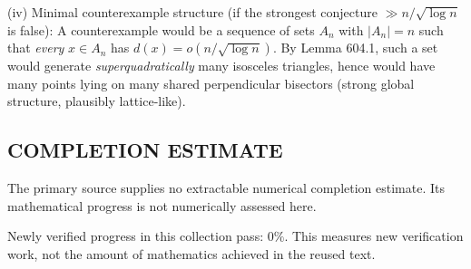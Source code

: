 (iv) Minimal counterexample structure (if the strongest conjecture $\gg n/\sqrt{\log n}$ is false):
A counterexample would be a sequence of sets $A_n$ with $|A_n|=n$ such that \emph{every} $x\in A_n$ has $d(x)=o(n/\sqrt{\log n})$.
By Lemma 604.1, such a set would generate \emph{superquadratically} many isosceles triangles, hence would have many points lying on many shared perpendicular bisectors (strong global structure, plausibly lattice-like).




\subsection*{COMPLETION ESTIMATE}
The primary source supplies no extractable numerical completion estimate. Its mathematical progress is not numerically assessed here.

Newly verified progress in this collection pass: $0\%$. This measures new verification work, not the amount of mathematics achieved in the reused text.
